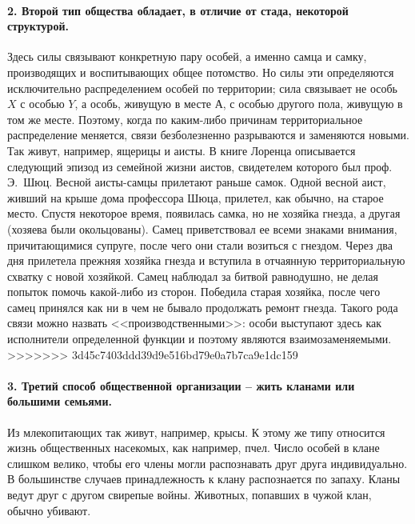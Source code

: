 \documentclass{book}
\begin{document}
\paragraph{2. Второй тип общества обладает, в отличие от стада, неко­торой структурой.} Здесь силы связывают конкретную пару особей, а именно самца и самку, производящих и воспитываю­щих общее потомство. Но силы эти определяются исключитель­но распределением особей по территории; сила связывает не особь $X$  с особью $Y$, а особь, живущую в месте $А$, с особью другого пола, живущую в том же месте. Поэтому, когда по каким-либо причинам территориальное распределение меняет­ся, связи безболезненно разрываются и заменяются новыми. Так живут, например, ящерицы и аисты. В книге Лоренца описы­вается следующий эпизод из семейной жизни аистов, свидете­лем которого был проф. Э.~Шюц. Весной аисты-самцы прилетают раньше самок. Одной весной аист, живший на крыше дома профессора Шюца, прилетел, как обычно, на старое место. Спустя некоторое время, появилась самка, но не хозяйка гнезда, а другая (хозяева были окольцованы). Самец приветствовал ее всеми знаками внимания, причитающимися супруге, после чего они стали возиться с 
гнездом. Через два дня прилетела прежняя хозяйка гнезда и вступила в отчаянную территориальную схватку с новой хозяйкой. Самец наблюдал за битвой равнодушно, не делая попыток помочь какой-либо из сторон. Победила старая хозяйка, после чего самец принялся как ни в чем не бывало продолжать ремонт гнезда. Такого рода связи можно назвать <<производственными>>: особи выступают здесь как исполнители определенной функции и поэтому являются взаимозаменяемыми.
>>>>>>> 3d45c7403ddd39d9e516bd79e0a7b7ca9e1dc159

\paragraph{3. Третий способ общественной организации -- жить клана­ми  или большими семьями.} Из млекопитающих так живут, например, крысы. К этому же типу относится жизнь обществен­ных насекомых, как например, пчел. Число особей в клане слишком велико, чтобы его члены могли распознавать друг друга индивидуально. В большинстве случаев принадлежность к клану распознается по запаху. Кланы ведут друг с другом свирепые войны. Животных, попавших в чужой клан, обычно убивают.
\end{document}
